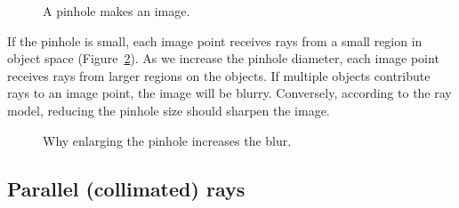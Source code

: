 \documentclass[
  letterpaper,
]{book}
\begin{document}
\begin{figure}


\caption{\label{fig-pinhole-image}A pinhole makes an image.}

\end{figure}%

If the pinhole is small, each image point receives rays from a small
region in object space (Figure~\ref{fig-pinhole-blur}). As we increase
the pinhole diameter, each image point receives rays from larger regions
on the objects. If multiple objects contribute rays to an image point,
the image will be blurry. Conversely, according to the ray model,
reducing the pinhole size should sharpen the image.

\begin{figure}


\caption{\label{fig-pinhole-blur}Why enlarging the pinhole increases the
blur.}

\end{figure}%

\subsection{Parallel (collimated) rays}\label{parallel-collimated-rays}
\end{document}
